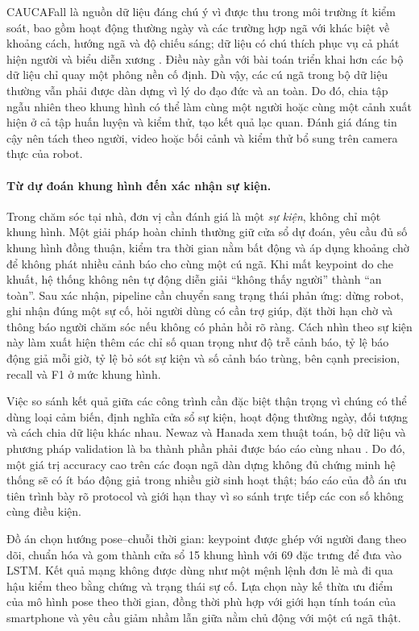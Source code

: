 CAUCAFall là nguồn dữ liệu đáng chú ý vì được thu trong môi trường ít kiểm soát, bao gồm hoạt động thường ngày và các trường hợp ngã với khác biệt về khoảng cách, hướng ngã và độ chiếu sáng; dữ liệu có chú thích phục vụ cả phát hiện người và biểu diễn xương . Điều này gần với bài toán triển khai hơn các bộ dữ liệu chỉ quay một phông nền cố định. Dù vậy, các cú ngã trong bộ dữ liệu thường vẫn phải được dàn dựng vì lý do đạo đức và an toàn. Do đó, chia tập ngẫu nhiên theo khung hình có thể làm cùng một người hoặc cùng một cảnh xuất hiện ở cả tập huấn luyện và kiểm thử, tạo kết quả lạc quan. Đánh giá đáng tin cậy nên tách theo người, video hoặc bối cảnh và kiểm thử bổ sung trên camera thực của robot.

\paragraph{Từ dự đoán khung hình đến xác nhận sự kiện.}
Trong chăm sóc tại nhà, đơn vị cần đánh giá là một \emph{sự kiện}, không chỉ một khung hình. Một giải pháp hoàn chỉnh thường giữ cửa sổ dự đoán, yêu cầu đủ số khung hình đồng thuận, kiểm tra thời gian nằm bất động và áp dụng khoảng chờ để không phát nhiều cảnh báo cho cùng một cú ngã. Khi mất keypoint do che khuất, hệ thống không nên tự động diễn giải ``không thấy người'' thành ``an toàn''. Sau xác nhận, pipeline cần chuyển sang trạng thái phản ứng: dừng robot, ghi nhận đúng một sự cố, hỏi người dùng có cần trợ giúp, đặt thời hạn chờ và thông báo người chăm sóc nếu không có phản hồi rõ ràng. Cách nhìn theo sự kiện này làm xuất hiện thêm các chỉ số quan trọng như độ trễ cảnh báo, tỷ lệ báo động giả mỗi giờ, tỷ lệ bỏ sót sự kiện và số cảnh báo trùng, bên cạnh precision, recall và F1 ở mức khung hình.

Việc so sánh kết quả giữa các công trình cần đặc biệt thận trọng vì chúng có thể dùng loại cảm biến, định nghĩa cửa sổ sự kiện, hoạt động thường ngày, đối tượng và cách chia dữ liệu khác nhau. Newaz và Hanada xem thuật toán, bộ dữ liệu và phương pháp validation là ba thành phần phải được báo cáo cùng nhau . Do đó, một giá trị accuracy cao trên các đoạn ngã dàn dựng không đủ chứng minh hệ thống sẽ có ít báo động giả trong nhiều giờ sinh hoạt thật; báo cáo của đồ án ưu tiên trình bày rõ protocol và giới hạn thay vì so sánh trực tiếp các con số không cùng điều kiện.

Đồ án chọn hướng pose--chuỗi thời gian: keypoint được ghép với người đang theo dõi, chuẩn hóa và gom thành cửa sổ 15 khung hình với 69 đặc trưng để đưa vào LSTM. Kết quả mạng không được dùng như một mệnh lệnh đơn lẻ mà đi qua hậu kiểm theo bằng chứng và trạng thái sự cố. Lựa chọn này kế thừa ưu điểm của mô hình pose theo thời gian, đồng thời phù hợp với giới hạn tính toán của smartphone và yêu cầu giảm nhầm lẫn giữa nằm chủ động với một cú ngã thật.

